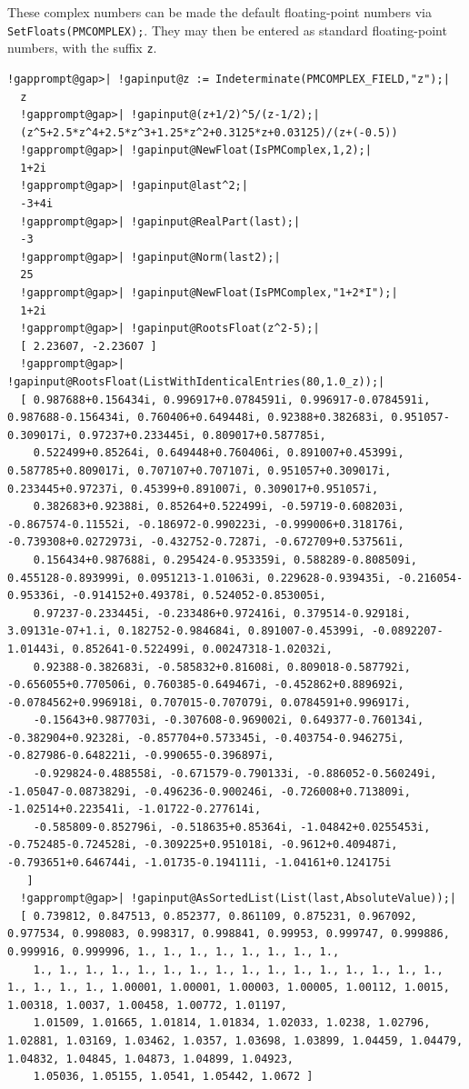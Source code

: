 \documentclass[a4paper,11pt]{report}
\begin{document}
{{{ These complex numbers can be made the default floating-point numbers via \texttt{SetFloats(PMCOMPLEX);}. They may then be entered as standard floating-point numbers, with the suffix \texttt{{\textunderscore}z}. 
\begin{Verbatim}[commandchars=!@|,fontsize=\small,frame=single,label=Example]
  !gapprompt@gap>| !gapinput@z := Indeterminate(PMCOMPLEX_FIELD,"z");|
  z
  !gapprompt@gap>| !gapinput@(z+1/2)^5/(z-1/2);|
  (z^5+2.5*z^4+2.5*z^3+1.25*z^2+0.3125*z+0.03125)/(z+(-0.5))
  !gapprompt@gap>| !gapinput@NewFloat(IsPMComplex,1,2);|
  1+2i
  !gapprompt@gap>| !gapinput@last^2;|
  -3+4i
  !gapprompt@gap>| !gapinput@RealPart(last);|
  -3
  !gapprompt@gap>| !gapinput@Norm(last2);|
  25
  !gapprompt@gap>| !gapinput@NewFloat(IsPMComplex,"1+2*I");|
  1+2i
  !gapprompt@gap>| !gapinput@RootsFloat(z^2-5);|
  [ 2.23607, -2.23607 ]
  !gapprompt@gap>| !gapinput@RootsFloat(ListWithIdenticalEntries(80,1.0_z));|
  [ 0.987688+0.156434i, 0.996917+0.0784591i, 0.996917-0.0784591i, 0.987688-0.156434i, 0.760406+0.649448i, 0.92388+0.382683i, 0.951057-0.309017i, 0.97237+0.233445i, 0.809017+0.587785i,
    0.522499+0.85264i, 0.649448+0.760406i, 0.891007+0.45399i, 0.587785+0.809017i, 0.707107+0.707107i, 0.951057+0.309017i, 0.233445+0.97237i, 0.45399+0.891007i, 0.309017+0.951057i,
    0.382683+0.92388i, 0.85264+0.522499i, -0.59719-0.608203i, -0.867574-0.11552i, -0.186972-0.990223i, -0.999006+0.318176i, -0.739308+0.0272973i, -0.432752-0.7287i, -0.672709+0.537561i,
    0.156434+0.987688i, 0.295424-0.953359i, 0.588289-0.808509i, 0.455128-0.893999i, 0.0951213-1.01063i, 0.229628-0.939435i, -0.216054-0.95336i, -0.914152+0.49378i, 0.524052-0.853005i,
    0.97237-0.233445i, -0.233486+0.972416i, 0.379514-0.92918i, 3.09131e-07+1.i, 0.182752-0.984684i, 0.891007-0.45399i, -0.0892207-1.01443i, 0.852641-0.522499i, 0.00247318-1.02032i,
    0.92388-0.382683i, -0.585832+0.81608i, 0.809018-0.587792i, -0.656055+0.770506i, 0.760385-0.649467i, -0.452862+0.889692i, -0.0784562+0.996918i, 0.707015-0.707079i, 0.0784591+0.996917i,
    -0.15643+0.987703i, -0.307608-0.969002i, 0.649377-0.760134i, -0.382904+0.92328i, -0.857704+0.573345i, -0.403754-0.946275i, -0.827986-0.648221i, -0.990655-0.396897i,
    -0.929824-0.488558i, -0.671579-0.790133i, -0.886052-0.560249i, -1.05047-0.0873829i, -0.496236-0.900246i, -0.726008+0.713809i, -1.02514+0.223541i, -1.01722-0.277614i,
    -0.585809-0.852796i, -0.518635+0.85364i, -1.04842+0.0255453i, -0.752485-0.724528i, -0.309225+0.951018i, -0.9612+0.409487i, -0.793651+0.646744i, -1.01735-0.194111i, -1.04161+0.124175i
   ]
  !gapprompt@gap>| !gapinput@AsSortedList(List(last,AbsoluteValue));|
  [ 0.739812, 0.847513, 0.852377, 0.861109, 0.875231, 0.967092, 0.977534, 0.998083, 0.998317, 0.998841, 0.99953, 0.999747, 0.999886, 0.999916, 0.999996, 1., 1., 1., 1., 1., 1., 1., 1.,
    1., 1., 1., 1., 1., 1., 1., 1., 1., 1., 1., 1., 1., 1., 1., 1., 1., 1., 1., 1., 1.00001, 1.00001, 1.00003, 1.00005, 1.00112, 1.0015, 1.00318, 1.0037, 1.00458, 1.00772, 1.01197,
    1.01509, 1.01665, 1.01814, 1.01834, 1.02033, 1.0238, 1.02796, 1.02881, 1.03169, 1.03462, 1.0357, 1.03698, 1.03899, 1.04459, 1.04479, 1.04832, 1.04845, 1.04873, 1.04899, 1.04923,
    1.05036, 1.05155, 1.0541, 1.05442, 1.0672 ]
  

\end{Verbatim}}}}
\end{document}
